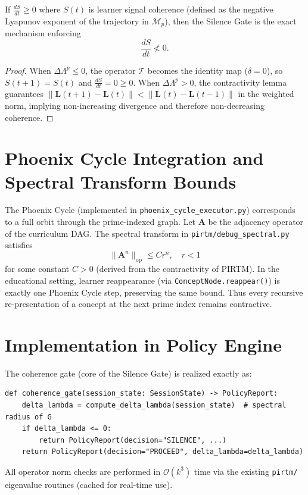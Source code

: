\documentclass[11pt,letterpaper]{article}
\begin{document}
\begin{corollary}
If $\frac{dS}{dt} \geq 0$ where $S(t)$ is learner signal coherence (defined as the negative Lyapunov exponent of the trajectory in $\mathcal{M}_p$), then the Silence Gate is the exact mechanism enforcing
\[
\frac{dS}{dt} \not< 0.
\]
\end{corollary}
\begin{proof}
When $\Delta\Lambda^p \leq 0$, the operator $\mathcal{T}$ becomes the identity map ($\delta=0$), so $S(t+1) = S(t)$ and $\frac{dS}{dt} = 0 \geq 0$. When $\Delta\Lambda^p > 0$, the contractivity lemma guarantees $\|\mathbf{L}(t+1) - \mathbf{L}(t)\| < \|\mathbf{L}(t) - \mathbf{L}(t-1)\|$ in the weighted norm, implying non-increasing divergence and therefore non-decreasing coherence.
\end{proof}

\section{Phoenix Cycle Integration and Spectral Transform Bounds}
The Phoenix Cycle (implemented in \texttt{phoenix\_cycle\_executor.py}) corresponds to a full orbit through the prime-indexed graph. Let $\mathbf{A}$ be the adjacency operator of the curriculum DAG. The spectral transform in \texttt{pirtm/debug\_spectral.py} satisfies
\[
\|\mathbf{A}^n\|_{\text{op}} \leq C r^n, \quad r < 1
\]
for some constant $C>0$ (derived from the contractivity of PIRTM). In the educational setting, learner reappearance (via \texttt{ConceptNode.reappear()}) is exactly one Phoenix Cycle step, preserving the same bound. Thus every recursive re-presentation of a concept at the next prime index remains contractive.

\section{Implementation in Policy Engine}
The coherence gate (core of the Silence Gate) is realized exactly as:
\begin{verbatim}
def coherence_gate(session_state: SessionState) -> PolicyReport:
    delta_lambda = compute_delta_lambda(session_state)  # spectral radius of G
    if delta_lambda <= 0:
        return PolicyReport(decision="SILENCE", ...)
    return PolicyReport(decision="PROCEED", delta_lambda=delta_lambda)
\end{verbatim}
All operator norm checks are performed in $\mathcal{O}(k^3)$ time via the existing \texttt{pirtm/} eigenvalue routines (cached for real-time use).
\end{document}
